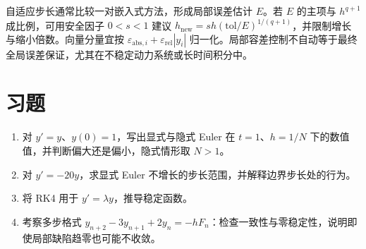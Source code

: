 自适应步长通常比较一对嵌入式方法，形成局部误差估计 $E$。若 $E$ 的主项与 $h^{q+1}$ 成比例，可用安全因子 $0<s<1$ 建议 $h_{\mathrm{new}}=sh(\mathrm{tol}/E)^{1/(q+1)}$，并限制增长与缩小倍数。向量分量宜按 $\varepsilon_{\mathrm{abs},i}+\varepsilon_{\mathrm{rel}}|y_i|$ 归一化。局部容差控制不自动等于最终全局误差保证，尤其在不稳定动力系统或长时间积分中。

\section{习题}
\begin{enumerate}[label=\arabic*.]
\item\label{exr:na-ode-euler} 对 $y'=y$、$y(0)=1$，写出显式与隐式 Euler 在 $t=1$、$h=1/N$ 下的数值值，并判断偏大还是偏小，隐式情形取 $N>1$。
\item\label{exr:na-ode-stability} 对 $y'=-20y$，求显式 Euler 不增长的步长范围，并解释边界步长处的行为。
\item\label{exr:na-ode-rk} 将 RK4 用于 $y'=\lambda y$，推导稳定函数。
\item\label{exr:na-ode-root} 考察多步格式 $y_{n+2}-3y_{n+1}+2y_n=-hF_n$：检查一致性与零稳定性，说明即使局部缺陷趋零也可能不收敛。
\end{enumerate}


